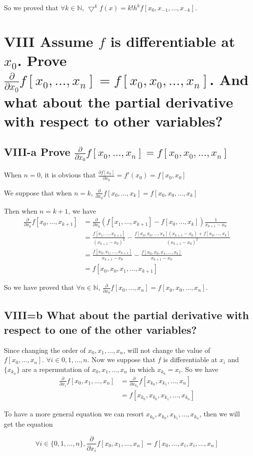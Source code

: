 \documentclass[twoside,a4paper]{article}
\begin{document}
So we proved that $\forall k\in\mathbb{N}$,
$\bigtriangledown^{k}f\left( x \right) =k!h^{k}f[x_{0},x_{-1},\ldots,x_{-k}]$.  

\section*{VIII \small{Assume $f$ is differentiable at  $x_{0}$.
Prove $\frac{\partial}{\partial x_0}f[x_0,\ldots,x_n]=f[x_0,x_0,\ldots,x_n]$. And what about the partial derivative with respect to other variables?}}

\subsection*{VIII-a \small{Prove $\frac{\partial}{\partial x_0}f[x_0,\ldots,x_n]=f[x_0,x_0,\ldots,x_n]$}}

When $n=0$, it is obvious that  $\frac{\partial f[x_0]}{\partial x_0}=f'\left( x_0 \right)=f[x_0,x_0] $

We suppose that when $n=k$, $\frac{\partial}{\partial x_0}f[x_0,\ldots,x_{k}]=f[x_0,x_0,\ldots,x_k]$

Then when $n=k+1$, we have
\begin{equation*}
\begin{split}
	\frac{\partial}{\partial x_0}f[x_0,\ldots,x_{k+1}]
	&=\frac{\partial}{\partial x_0}\left( f[x_1,\ldots,x_{k+1}]-f[x_0,\ldots,x_{k}] \right)\frac{1}{x_{k+1}-x_0}\\
	&=\frac{f[x_1,\ldots,x_{k+1}]}{\left( x_{k+1}-x_0 \right)^2 }
	-\frac{f[x_0,x_0,\ldots,x_{k}]\left( x_{k+1}-x_0 \right)+f[x_0,\ldots,x_{k}] }{\left( x_{k+1}-x_0 \right)^2 }\\
	&=\frac{f[x_0,x_1,\ldots,x_{k+1}]}{x_{k+1}-x_0}-\frac{f[x_0,x_0,x_1,\ldots,x_{k}]}{x_{k+1}-x_0}\\
	&=f[x_0,x_0,x_1,\ldots,x_{k+1}]
\end{split}
\end{equation*}

So we have proved that $\forall n\in\mathbb{N}$, $\frac{\partial}{\partial x_0}f[x_0,\ldots,x_n]=f[x_0,x_0,\ldots,x_n]$.

\subsection*{VIII=b \small{What about the partial derivative with respect to one of the other variables?}}

Since changing the order of $x_0,x_1,\ldots,x_{n}$, will not change the value of $f[x_0,\ldots,x_{n}]$.
$\forall i\in{0,1,\ldots,n}$. Now we suppose that $f$ is differentiable at  $x_{i}$ 
and $\{x_{k_{n}}\}$ are a repermutation of $x_0,x_1,\ldots,x_{n}$ in which $x_{k_{0}}=x_{i}$.
So we have
\begin{equation*}
\begin{split}
	\frac{\partial}{\partial x_{i}}f[x_0,x_1,\ldots,x_{n}]&=\frac{\partial}{\partial x_{k_{0}}}f[x_{k_{0}},x_{k_{1}},\ldots,x_{n}]\\
							      &=f[x_{k_{0}},x_{k_{0}},x_{k_{1}},\ldots,x_{k_{n}}]
\end{split}
\end{equation*}

To have a more general equation we can resort $x_{k_{0}}, x_{k_{0}},x_{k_1},\ldots,x_{k_{n}}$, then we will get the equation

$$\forall i\in\{0,1,\ldots,n\},\frac{\partial}{\partial x_{i}}f[x_0,x_1,\ldots,x_{n}]=f[x_{0},\ldots,x_{i},x_{i},\ldots,x_{n}]$$
\end{document}
